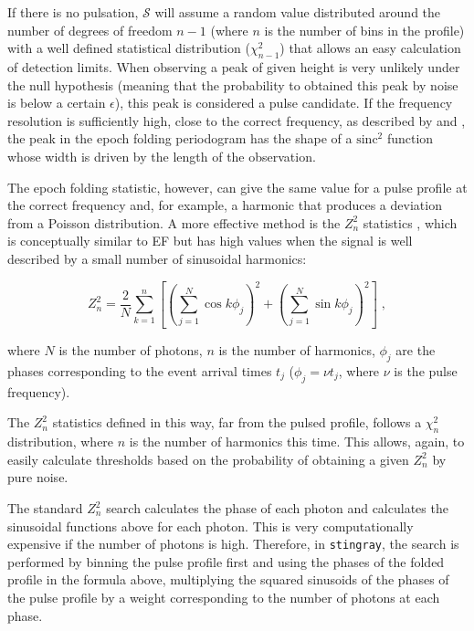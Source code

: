 \documentclass[twocolumn]{aastex62}
\newcommand{\zsq}{\ensuremath{Z^2_n}\xspace}
\newcommand{\stingray}{\texttt{stingray}\xspace}
\begin{document}
If there is no pulsation, $\mathcal{S}$ will assume a random value distributed around the number of degrees of freedom $n - 1$ (where $n$ is the number of bins in the profile) with a well defined statistical distribution ($\chi^2_{n - 1}$) that allows an easy calculation of detection limits. 
When observing a peak of given height is very unlikely under the null hypothesis (meaning that the probability to obtained this peak by noise is below a certain $\epsilon$), this peak is considered a pulse candidate.
If the frequency resolution is sufficiently high, close to the correct frequency, as described by \citet{leahy1983b} and \citet{leahy1987}, the peak in the epoch folding periodogram has the shape of a $\mathrm{sinc}^2$ function whose width is driven by the length of the observation.

The epoch folding statistic, however, can give the same value for a pulse profile at the correct frequency and, for example, a harmonic that produces a deviation from a Poisson distribution.
A more effective method is the $Z^2_n$ statistics \citep{buccheri1983}, which is conceptually similar to EF but has high values when the signal is well described by a small number of sinusoidal harmonics: 

\begin{equation}
\zsq = \dfrac{2}{N} \sum_{k=1}^n \left[{\left(\sum_{j=1}^N \cos k \phi_j\right)}^2 + {\left(\sum_{j=1}^N \sin k \phi_j\right)}^2\right] \; ,
\end{equation}

\noindent where $N$ is the number of photons, $n$ is the number of harmonics, $\phi_j$ are the phases corresponding to the event arrival times $t_j$ ($\phi_j = \nu t_j$, where $\nu$ is the pulse frequency).

The \zsq statistics defined in this way, far from the pulsed profile, follows a $\chi^2_n$ distribution, where $n$ is the number of harmonics this time.
This allows, again, to easily calculate thresholds based on the probability of obtaining a given \zsq by pure noise.

The standard \zsq search calculates the phase of each photon and calculates the sinusoidal functions above for each photon.
This is very computationally expensive if the number of photons is high. 
Therefore, in \stingray, the search is performed by binning the pulse profile first and using the phases of the folded profile in the formula above, multiplying the squared sinusoids of the phases of the pulse profile by a weight corresponding to the number of photons at each phase.
\end{document}
